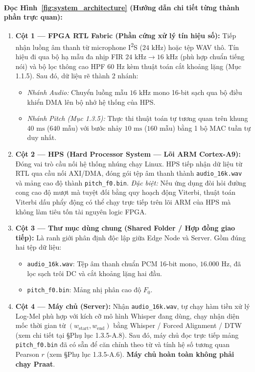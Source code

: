 \documentclass[11pt,a4paper]{article}
\begin{document}
\paragraph{Đọc Hình~\ref{fig:system_architecture} (Hướng dẫn chi tiết từng thành phần trực quan):}
\begin{enumerate}
    \setlength{\itemsep}{1.5pt}
    \item \textbf{Cột 1 --- FPGA RTL Fabric (Phần cứng xử lý tín hiệu số):} Tiếp nhận luồng âm thanh từ microphone I\textsuperscript{2}S ($24\text{ kHz}$) hoặc tệp WAV thô. Tín hiệu đi qua bộ hạ mẫu đa nhịp FIR $24\text{ kHz} \to 16\text{ kHz}$ (phù hợp chuẩn tiếng nói) và bộ lọc thông cao HPF $60\text{ Hz}$ kèm thuật toán cắt khoảng lặng (Mục 1.1.5). Sau đó, dữ liệu rẽ thành 2 nhánh:
    \begin{itemize}
        \item \emph{Nhánh Audio:} Chuyển luồng mẫu $16\text{ kHz}$ mono 16-bit sạch qua bộ điều khiển DMA lên bộ nhớ hệ thống của HPS.
        \item \emph{Nhánh Pitch (Mục 1.3.5):} Thực thi thuật toán tự tương quan trên khung $40\text{ ms}$ ($640$ mẫu) với bước nhảy $10\text{ ms}$ ($160$ mẫu) bằng 1 bộ MAC tuần tự duy nhất.
    \end{itemize}
    \item \textbf{Cột 2 --- HPS (Hard Processor System --- Lõi ARM Cortex-A9):} Đóng vai trò cầu nối hệ thống nhúng chạy Linux. HPS tiếp nhận dữ liệu từ RTL qua cầu nối AXI/DMA, đóng gói tệp âm thanh thành \texttt{audio\_16k.wav} và mảng cao độ thành \texttt{pitch\_f0.bin}. \emph{Đặc biệt:} Nếu ứng dụng đòi hỏi đường cong cao độ mượt mà tuyệt đối bằng quy hoạch động Viterbi, thuật toán Viterbi dấu phẩy động có thể chạy trực tiếp trên lõi ARM của HPS mà không làm tiêu tốn tài nguyên logic FPGA.
    \item \textbf{Cột 3 --- Thư mục dùng chung (Shared Folder / Hợp đồng giao tiếp):} Là ranh giới phân định độc lập giữa Edge Node và Server. Gồm đúng hai tệp dữ liệu:
    \begin{itemize}
        \item \texttt{audio\_16k.wav}: Tệp âm thanh chuẩn PCM 16-bit mono, $16.000\text{ Hz}$, đã lọc sạch trôi DC và cắt khoảng lặng hai đầu.
        \item \texttt{pitch\_f0.bin}: Mảng nhị phân cao độ $F_0$.
    \end{itemize}
    \item \textbf{Cột 4 --- Máy chủ (Server):} Nhận \texttt{audio\_16k.wav}, tự chạy hàm tiền xử lý Log-Mel phù hợp với kích cỡ mô hình Whisper đang dùng, chạy nhận diện mốc thời gian từ $(w_{\text{start}}, w_{\text{end}})$ bằng Whisper / Forced Alignment / DTW (xem chi tiết tại §Phụ lục 1.3.5-A.8). Sau đó, máy chủ đọc trực tiếp mảng \texttt{pitch\_f0.bin} đã có sẵn để căn chỉnh theo từ và tính hệ số tương quan Pearson $r$ (xem §Phụ lục 1.3.5-A.6). \textbf{Máy chủ hoàn toàn không phải chạy Praat}.
\end{enumerate}
\end{document}
